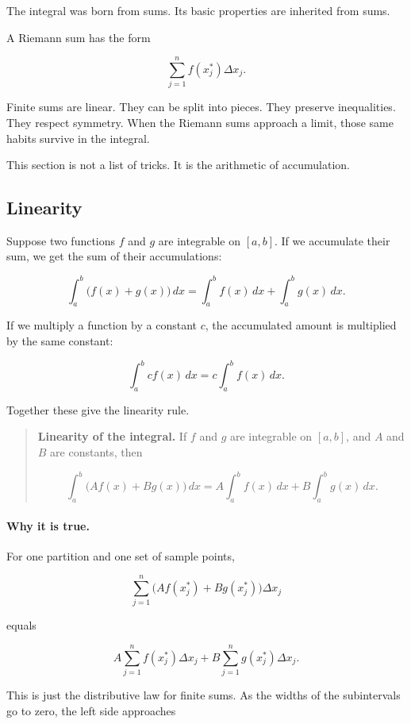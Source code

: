 The integral was born from sums.  Its basic properties are inherited from sums.

A Riemann sum has the form

\[
\sum_{j=1}^{n} f(x_j^*)\Delta x_j.
\]

Finite sums are linear.  They can be split into pieces.  They preserve inequalities.  They
respect symmetry.  When the Riemann sums approach a limit, those same habits survive
in the integral.

This section is not a list of tricks.  It is the arithmetic of accumulation.

\subsection{Linearity}
\label{subsec:integral-linearity}

Suppose two functions \(f\) and \(g\) are integrable on \([a,b]\).  If we accumulate their
sum, we get the sum of their accumulations:

\[
\int_a^b \bigl(f(x)+g(x)\bigr)\,dx
=
\int_a^b f(x)\,dx+\int_a^b g(x)\,dx.
\]

If we multiply a function by a constant \(c\), the accumulated amount is multiplied by
the same constant:

\[
\int_a^b c f(x)\,dx
=
c\int_a^b f(x)\,dx.
\]

Together these give the linearity rule.

\begin{quote}
\textbf{Linearity of the integral.}
If \(f\) and \(g\) are integrable on \([a,b]\), and \(A\) and \(B\) are constants, then

\[
\boxed{
\int_a^b \bigl(Af(x)+Bg(x)\bigr)\,dx
=
A\int_a^b f(x)\,dx
+
B\int_a^b g(x)\,dx.
}
\]
\end{quote}

\paragraph{Why it is true.}
For one partition and one set of sample points,

\[
\sum_{j=1}^{n} \bigl(Af(x_j^*)+Bg(x_j^*)\bigr)\Delta x_j
\]

equals

\[
A\sum_{j=1}^{n} f(x_j^*)\Delta x_j
+
B\sum_{j=1}^{n} g(x_j^*)\Delta x_j.
\]

This is just the distributive law for finite sums.  As the widths of the subintervals go to
zero, the left side approaches

